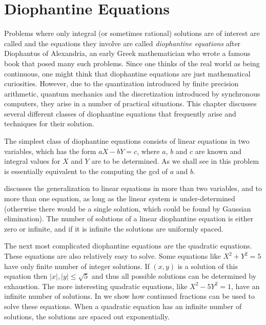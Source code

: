\chapter{Diophantine Equations}
\label{Diophan:Eq:Chap}

Problems where only integral (or sometimes rational) solutions are of
interest are called  and the equations they
involve are called {\em diophantine equations} after Diophantus of
Alexandria, an early Greek
mathematician who wrote a famous book that posed many such problems.
Since one thinks of the real world as being continuous, one might
think that diophantine equations are just mathematical curiosities.
However, due to the quantization introduced by finite precision
arithmetic, quantum mechanics and the discretization introduced by
synchronous computers, they arise in a number of practical situations.
This chapter discusses several different classes of diophantine
equations that frequently arise and techniques for their solution.

The simplest class of diophantine equations consists of linear
equations in two variables, which has the form $aX - bY = c$, where
$a$, $b$ and $c$ are known and integral values for $X$ and $Y$ are to
be determined.  As we shall see in  this
problem is essentially equivalent 
to the computing the {\sc gcd} of $a$ and $b$.  

 discusses the generalization to
linear equations in more than two variables, and to more than one
equation, as long as the linear system is under-determined (otherwise
there would be a single solution, which could be found by Gaussian
elimination).  The number of solutions of a linear diophantine
equation is either zero or infinite, and if it is infinite the
solutions are uniformly spaced.

The next most complicated diophantine equations are the quadratic
equations.  These equations are also relatively easy to solve.  Some
equations like $X^2 + Y^2 = 5$ have only finite number of integer
solutions.  If $(x,y)$ is a solution of this equation then $|x|, |y|
\le \sqrt{5}$ and thus all possible solutions can be determined by
exhaustion.  The more interesting quadratic equations, like $X^2 -
5Y^2 = 1$, have an infinite number of solutions.  In
 we show how continued fractions
can be used to solve these equations.  When a quadratic equation has
an infinite number of solutions, the solutions are spaced out
exponentially.

